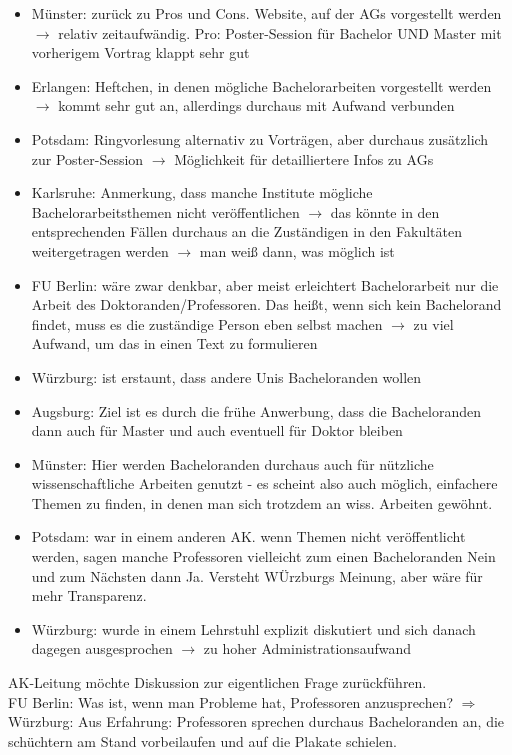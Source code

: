     \begin{itemize}
      \item Münster: zurück zu Pros und Cons. Website, auf der AGs vorgestellt werden $\rightarrow$ relativ zeitaufwändig. Pro: Poster-Session für Bachelor UND Master mit vorherigem Vortrag klappt sehr gut
      \item Erlangen: Heftchen, in denen mögliche Bachelorarbeiten vorgestellt werden $\rightarrow$ kommt sehr gut an, allerdings durchaus mit Aufwand verbunden
      \item Potsdam: Ringvorlesung alternativ zu Vorträgen, aber durchaus zusätzlich zur Poster-Session $\rightarrow$ Möglichkeit für detailliertere Infos zu AGs
      \item Karlsruhe: Anmerkung, dass manche Institute mögliche Bachelorarbeitsthemen nicht veröffentlichen $\rightarrow$ das könnte in den entsprechenden Fällen durchaus an die Zuständigen in den Fakultäten weitergetragen werden $\rightarrow$ man weiß dann, was möglich ist
      \item FU Berlin: wäre zwar denkbar, aber meist erleichtert Bachelorarbeit nur die Arbeit des Doktoranden/Professoren. Das heißt, wenn sich kein Bachelorand findet, muss es die zuständige Person eben selbst machen $\rightarrow$ zu viel Aufwand, um das in einen Text zu formulieren
      \item Würzburg: ist erstaunt, dass andere Unis Bacheloranden wollen
      \item Augsburg: Ziel ist es durch die frühe Anwerbung, dass die Bacheloranden dann auch für Master und auch eventuell für Doktor bleiben
      \item Münster: Hier werden Bacheloranden durchaus auch für nützliche wissenschaftliche Arbeiten genutzt - es scheint also auch möglich, einfachere Themen zu finden, in denen man sich trotzdem an wiss. Arbeiten gewöhnt.
      \item Potsdam: war in einem anderen AK. wenn Themen nicht veröffentlicht werden, sagen manche Professoren vielleicht zum einen Bacheloranden Nein und zum Nächsten dann Ja. Versteht WÜrzburgs Meinung, aber wäre für mehr Transparenz.
      \item Würzburg: wurde in einem Lehrstuhl explizit diskutiert und sich danach dagegen ausgesprochen $\rightarrow$ zu hoher Administrationsaufwand
    \end{itemize}
    AK-Leitung möchte Diskussion zur eigentlichen Frage zurückführen. \\

    FU Berlin: Was ist, wenn man Probleme hat, Professoren anzusprechen? $\Rightarrow$
    Würzburg: Aus Erfahrung: Professoren sprechen durchaus Bacheloranden an, die schüchtern am Stand vorbeilaufen und auf die Plakate schielen. \\

